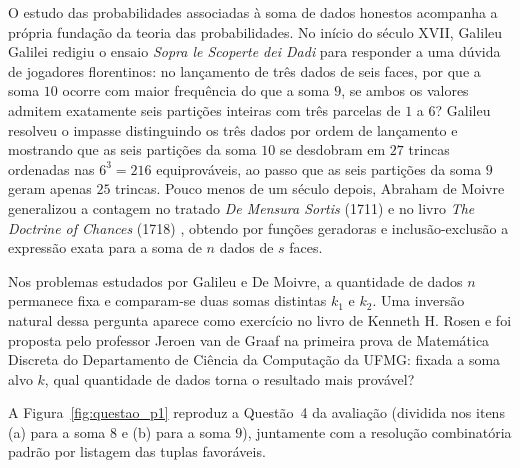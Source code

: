 \documentclass[11pt,a4paper]{article}
\theoremstyle{definition}
\theoremstyle{remark}
\begin{document}
O estudo das probabilidades associadas à soma de dados honestos acompanha a própria fundação da teoria das probabilidades. No início do século XVII, Galileu Galilei redigiu o ensaio \textit{Sopra le Scoperte dei Dadi} \cite{galilei1620,david1962} para responder a uma dúvida de jogadores florentinos: no lançamento de três dados de seis faces, por que a soma $10$ ocorre com maior frequência do que a soma $9$, se ambos os valores admitem exatamente seis partições inteiras com três parcelas de $1$ a $6$? Galileu resolveu o impasse distinguindo os três dados por ordem de lançamento e mostrando que as seis partições da soma $10$ se desdobram em $27$ trincas ordenadas nas $6^3 = 216$ equiprováveis, ao passo que as seis partições da soma $9$ geram apenas $25$ trincas. Pouco menos de um século depois, Abraham de Moivre generalizou a contagem no tratado \textit{De Mensura Sortis} (1711) e no livro \textit{The Doctrine of Chances} (1718) \cite{demoivre1711,demoivre1718}, obtendo por funções geradoras e inclusão-exclusão a expressão exata para a soma de $n$ dados de $s$ faces.

Nos problemas estudados por Galileu e De Moivre, a quantidade de dados $n$ permanece fixa e comparam-se duas somas distintas $k_1$ e $k_2$. Uma inversão natural dessa pergunta aparece como exercício no livro de Kenneth H. Rosen \cite[Cap.~7, Seção~7.1, Exercícios~36 e~37]{rosen2019} e foi proposta pelo professor Jeroen van de Graaf na primeira prova de Matemática Discreta do Departamento de Ciência da Computação da UFMG: fixada a soma alvo $k$, qual quantidade de dados torna o resultado mais provável?

A Figura~\ref{fig:questao_p1} reproduz a Questão~4 da avaliação (dividida nos itens (a) para a soma $8$ e (b) para a soma $9$), juntamente com a resolução combinatória padrão por listagem das tuplas favoráveis.
\end{document}

